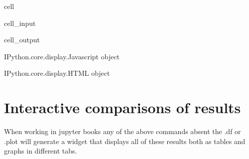 \documentclass[letterpaper,10pt,english]{jupyterBook}
\begin{document}
\begin{sphinxuseclass}{cell}\begin{sphinxVerbatimInput}

\begin{sphinxuseclass}{cell_input}
\begin{sphinxVerbatim}[commandchars=\\\{\}]
\PYG{p}{[}\PYG{p}{]}
\end{sphinxVerbatim}

\end{sphinxuseclass}\end{sphinxVerbatimInput}
\begin{sphinxVerbatimOutput}

\begin{sphinxuseclass}{cell_output}
\begin{sphinxVerbatim}[commandchars=\\\{\}]
\PYGZlt{}IPython.core.display.Javascript object\PYGZgt{}
\end{sphinxVerbatim}

\begin{sphinxVerbatim}[commandchars=\\\{\}]
\PYGZlt{}IPython.core.display.HTML object\PYGZgt{}
\end{sphinxVerbatim}

\end{sphinxuseclass}\end{sphinxVerbatimOutput}

\end{sphinxuseclass}

\section{Interactive comparisons of results}
\label{\detokenize{content/05_SimpleModel/SimpleModel:interactive-comparisons-of-results}}
\sphinxAtStartPar
When working in jupyter books any of the above commands absent the .df or .plot will generate a widget that displays all of these results both as tables and graphs in different tabs.
\end{document}
